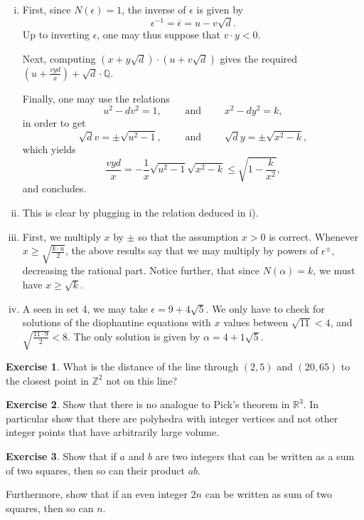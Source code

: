 \documentclass[12pt,a4paper]{article}
\theoremstyle{plain}
\newtheorem*{Sol*}{Solution}
\theoremstyle{definition}
\newtheorem{Ex}{Exercise}
\def \Q {\mathbb Q}
\newif\ifsolutions
\newcommand{\exercise}[2]{
			\begin{Ex} #1 \end{Ex}
			\ifsolutions  \begin{Sol*} #2 \end{Sol*} \bigskip \else \bigskip  \fi
		}
\begin{document}
{
	\begin{enumerate}[i)]
		\item 
		First, since $N(\epsilon)=1$, the inverse of $\epsilon$ is given by
			\[ \epsilon^{-1} = \overline{\epsilon} = u - v \sqrt{d}. \]
		Up to inverting $\epsilon$, one may thus suppose that $v \cdot y < 0$.

		Next, computing $(x+y\sqrt{d}) \cdot (u+v \sqrt{d})$ gives the required $\left(u+ \frac{vyd}{x} \right) + \sqrt{d} \cdot \Q$.

		Finally, one may use the relations
			\[ u^2 - dv^2 = 1, \qquad \text{ and } \qquad x^2 - dy^2 = k,\]
		in order to get
			\[ \sqrt{d} v = \pm \sqrt{u^2 - 1}, \qquad \text{ and } \qquad \sqrt{d} y = \pm \sqrt{x^2 - k}, \]
		which yields
			\[ \frac{vyd}{x} = - \frac1x \sqrt{u^2 - 1} \sqrt{x^2 - k} \leq \sqrt{1 - \frac{k}{x^2}}, \]
		and concludes.
		
		\item
		This is clear by plugging in the relation deduced in i).

		\item 
		First, we multiply $x$ by $\pm$ so that the assumption $x > 0$ is correct.
		Whenever $x \geq \sqrt{\frac{k \cdot u}{2}}$, the above results say that we may multiply by powers of $\epsilon^\pm$, decreasing the rational part.
		Notice further, that since $N(\alpha)=k$, we must have $x \geq \sqrt{k}$.

		\item
		A seen in set 4, we may take $\epsilon = 9 + 4\sqrt{5}$.
		We only have to check for solutions of the diophantine equations with $x$ values between $\sqrt{11} < 4$, and $\sqrt{\frac{11 \cdot 9}2} < 8$.
		The only solution is given by $\alpha = 4 + 1\sqrt{5}$.
	\end{enumerate}

}

\exercise{
 What is the distance of the line
through $(2,5)$ and $(20, 65)$ to the closest
point in $\mathbb{Z}^2$ not on this line?

}
{}

\exercise{
	 Show that there is no analogue to Pick's theorem in $\mathbb{R}^3$. In particular show that there are polyhedra with integer vertices and not other integer points that have arbitrarily large volume.

}
{}

\exercise{ 
	Show that if $a$ and $b$ are two integers that can be written as a sum of two squares, then so can their product $ab$.	

	Furthermore, show that if an even integer $2n$ can be written as sum of two squares, then so can $n$.
}
{}
\end{document}
